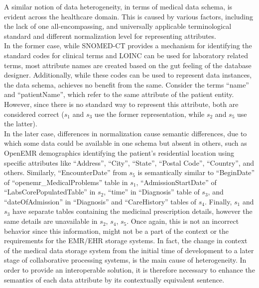 \documentclass{ieeeaccess}
\begin{document}
A similar notion of data heterogeneity, in terms of medical data schema, is evident across the healthcare domain. This is caused by various factors, including the lack of one all-encompassing, and universally applicable terminological standard and different normalization level for representing attributes.\\
In the former case, while SNOMED-CT provides a mechanism for identifying the standard codes for clinical terms and LOINC can be used for laboratory related terms, most attribute names are created based on the gut feeling of the database designer. Additionally, while these codes can be used to represent data instances, the data schema, achieves no benefit from the same.  Consider the terms ``name'' and ``patientName'', which refer to the same attribute of the patient entity.  However, since there is no standard way to represent this attribute, both are considered correct ($s_1$ and $s_3$ use the former representation, while $s_2$ and $s_5$ use the latter).\\
In the later case, differences in normalization cause semantic differences, due to which some data could be available in one schema but absent in others, such as OpenEMR demographics identifying the patient's residential location using specific attributes like ``Address'', ``City'', ``State'', ``Postal Code'', ``Country'', and others. Similarly, ``EncounterDate'' from $s_5$ is semantically similar to ``BeginDate'' of ``openemr\_MedicalProblems'' table in $s_1$, ``AdmissionStartDate'' of ``LabsCorePopulatedTable'' in $s_2$, 
``time'' in ``Diagnosis'' table of $s_3$, and  ``dateOfAdmission'' in ``Diagnosis'' and ``CareHistory'' tables of $s_4$.
Finally, $s_1$ and $s_3$ have separate tables containing the medicinal prescription details, however the same details are unavailable in $s_2$, $s_4$, $s_5$. Once again, this is not an incorrect behavior since this information, might not be a part of the context or the requirements for the EMR/EHR storage systems.
In fact, the change in context of the medical data storage system from the initial time of development to a later stage of collaborative processing systems, is the main cause of heterogeneity. In order to provide an interoperable solution, it is therefore necessary to enhance the semantics of each data attribute by its contextually equivalent sentence. 
\end{document}
